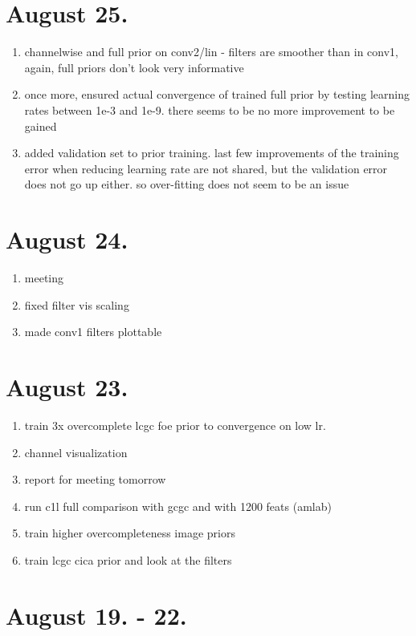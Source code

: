 \documentclass{article}
\begin{document}
\section{August 25.}

\begin{enumerate}
	\item channelwise and full prior on conv2/lin - filters are smoother than in conv1, again, full priors don't look very informative
	\item once more, ensured actual convergence of trained full prior by testing learning rates between 1e-3 and 1e-9. there seems to be no more improvement to be gained
	\item added validation set to prior training. last few improvements of the training error when reducing learning rate are not shared, but the validation error does not go up either. so over-fitting does not seem to be an issue
\end{enumerate}


\section{August 24.}

\begin{enumerate}
	\item meeting
	\item fixed filter vis scaling
	\item made conv1 filters plottable
\end{enumerate}


\section{August 23.}

\begin{enumerate}
	\item train 3x overcomplete lcgc foe prior to convergence on low lr.
	\item channel visualization
	\item report for meeting tomorrow
	\item run c1l full comparison with gcgc and with 1200 feats (amlab)
	\item train higher overcompleteness image priors
	\item train lcgc cica prior and look at the filters
\end{enumerate}

\section{August 19. - 22.}
\end{document}
